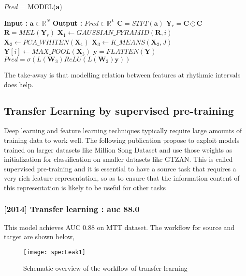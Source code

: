 \begin{algorithm}
  \caption{$Pred$ = MODEL($\textbf{a}$) }\label{Temporal Pooling}
  \begin{algorithmic}[1]
    \Statex \textbf{Input :} $\textbf{a} \in \mathbb{R}^{N}$
    \Statex \textbf{Output :} $Pred \in \mathbb{R}^{L}$ 
    \State $\textbf{C} = STFT(\textbf{a})$ 
    \State $\textbf{Y}_{r} = \textbf{C} \odot \textbf{C}$ 
    \State $\textbf{R} = MEL(\textbf{Y}_{r})$ 
     \State $\textbf{X}_{1} \leftarrow GAUSSIAN\_PYRAMID(\textbf{R},i)$ 
    \State $\textbf{X}_{2} \leftarrow PCA\_WHITEN(\textbf{X}_{1})$ 
     \State $\textbf{X}_{3} \leftarrow K\_MEANS(\textbf{X}_{2},J)$ 
    \State $\textbf{Y}[i] \leftarrow MAX\_POOL(\textbf{X}_{3})$ 
    \EndFor
    \State $\textbf{y} = FLATTEN(\textbf{Y})$ 
    \State $Pred = \sigma(L(\textbf{W}_{3})ReLU(L(\textbf{W}_{2})\textbf{y}))$ 
  \end{algorithmic}
\end{algorithm}
\noindent The take-away is that modelling relation between features at rhythmic intervals does help.

\subsection{Transfer Learning by supervised pre-training}
Deep learning and feature learning techniques  typically require large amounts of training data to work well. The following publication propose to exploit models trained on larger datasets like Million Song Dataset and use those weights as initialization for classification on smaller datasets like GTZAN. This is called supervised pre-training and it is essential to have a source task that requires a very rich feature representation, so as to ensure that the information content of this representation is likely to be useful for other tasks

\subsubsection{[2014] Transfer learning : auc 88.0}
This model achieves AUC 0.88 on MTT dataset. The workflow for source and target are shown below,
\begin{figure}[h] 
\centering
\texttt{[image: specLeak1]}
\caption{Schematic overview of the workflow of transfer learning}
 \label{fig:transfer learning}
 \end{figure}
\FloatBarrier
\bigskip

